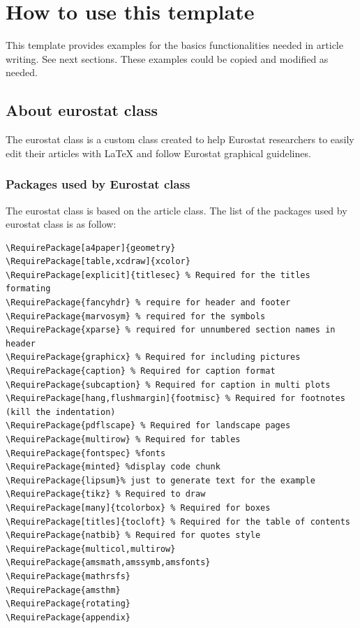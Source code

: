 \documentclass[Theme1]{{template_material/eurostat}}
\begin{document}

\section{How to use this template}

This template provides examples for the basics functionalities needed in article writing. See next sections. These examples could be copied and modified as needed.

\subsection{About eurostat class}

The eurostat class is a custom class created to help Eurostat researchers to easily edit their articles with LaTeX and follow Eurostat graphical guidelines. 

\subsubsection{Packages used by Eurostat class}

The eurostat class is based on the article class. The list of the packages used by eurostat class is as follow:
\begin{verbatim}
\RequirePackage[a4paper]{geometry}
\RequirePackage[table,xcdraw]{xcolor}
\RequirePackage[explicit]{titlesec} % Required for the titles formating
\RequirePackage{fancyhdr} % require for header and footer
\RequirePackage{marvosym} % required for the symbols 
\RequirePackage{xparse} % required for unnumbered section names in header
\RequirePackage{graphicx} % Required for including pictures
\RequirePackage{caption} % Required for caption format
\RequirePackage{subcaption} % Required for caption in multi plots
\RequirePackage[hang,flushmargin]{footmisc} % Required for footnotes (kill the indentation)
\RequirePackage{pdflscape} % Required for landscape pages
\RequirePackage{multirow} % Required for tables
\RequirePackage{fontspec} %fonts
\RequirePackage{minted} %display code chunk
\RequirePackage{lipsum}% just to generate text for the example
\RequirePackage{tikz} % Required to draw 
\RequirePackage[many]{tcolorbox} % Required for boxes
\RequirePackage[titles]{tocloft} % Required for the table of contents
\RequirePackage{natbib} % Required for quotes style
\RequirePackage{multicol,multirow}
\RequirePackage{amsmath,amssymb,amsfonts}
\RequirePackage{mathrsfs}
\RequirePackage{amsthm}
\RequirePackage{rotating}
\RequirePackage{appendix}
\end{verbatim}
\end{document}
